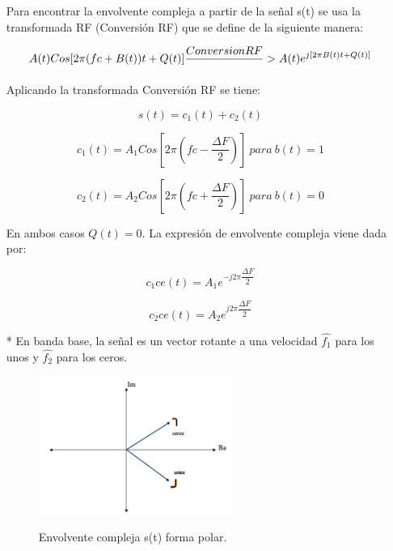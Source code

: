 \begin{itemize}
Para encontrar la envolvente compleja a partir de la se\~nal s(t) se usa la transformada RF (Conversión RF) que se define de la siguiente manera:\

\begin{equation}  \label{capdos_treintanueve}
A(t) Cos[ 2\pi(fc + B(t)) t + Q(t)] \\\\
\dfrac{Conversion RF}{} > A(t) e^{j[ 2\pi B(t) t + Q(t)]}  
\end{equation}

Aplicando la transformada Conversión RF se tiene:

\begin{equation}  \label{capdos_cuarenta}
s(t) = c_{1}(t) +c_{2}(t)
\end{equation}

\begin{equation}  \label{capdos_cuarentayuno}
 c_{1}(t)= A_{1} Cos [2\pi  (fc-\dfrac{\Delta F}{2})]\: para \: b(t)=1 
\end{equation}

\begin{equation}  \label{capdos_cuarentaydos}
 c_{2}(t)= A_{2} Cos [2\pi (fc+\dfrac{\Delta F}{2})] \: para \: b(t)=0 
\end{equation}


En ambos casos $Q(t)=0.$ La expresi\'on de envolvente compleja viene dada por:


\begin{equation}  \label{capdos_cuarentaytres}
c_{1}ce(t)=  A_{1} e^{-j2\pi \dfrac{\Delta F}{2}} \end{equation}

\begin{equation}  \label{capdos_cuarentaycuatro}
c_{2}ce(t)=  A_{2} e^{j2\pi \dfrac{\Delta F}{2}}
\end{equation}

 
 
\item[*] En banda base, la se\~nal es un vector rotante a una velocidad $\hat{f_{1}}$ para los unos y  $\hat{f_{2}}$ para los ceros.\\

 
\begin{figure}[h!]
	\captionsetup{justification = raggedright, singlelinecheck = false}
    \caption{Envolvente compleja s(t) forma polar.}
    \centering
    \includegraphics[width=0.6\textwidth]{Imagenes/12.jpeg}
    \label{fig:Envol-polar}
\end{figure}



\end{itemize}
